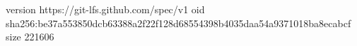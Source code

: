 version https://git-lfs.github.com/spec/v1
oid sha256:be37a553850dcb63388a2f22f128d68554398b4035daa54a9371018ba8ecabcf
size 221606
